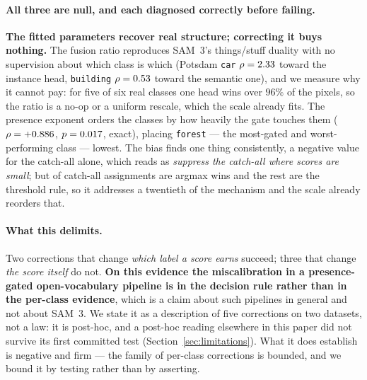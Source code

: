\documentclass[10pt,a4paper]{article}                        %
\newcommand{\best}[1]{\textbf{#1}}
\begin{document}
\paragraph{All three are null, and each diagnosed correctly before failing.}
\best{The fitted parameters recover real structure; correcting it buys nothing.}
The fusion ratio reproduces SAM~3's things/stuff duality with no supervision about
which class is which (Potsdam \texttt{car} $\rho=2.33{}$ toward the instance
head, \texttt{building} $\rho=0.53{}$ toward the semantic one), and we
measure why it cannot pay: for five of six real classes one head wins over
$96\%$ of the pixels, so the ratio is a no-op or a uniform rescale, which the
scale already fits. The presence exponent orders the classes by how heavily the
gate touches them ($\rho=+0.886{}$, $p=0.017{}$, exact), placing
\texttt{forest} --- the most-gated and worst-performing class --- lowest. The bias
finds one thing consistently, a negative value for the catch-all alone, which
reads as \emph{suppress the catch-all where scores are small}; but \mechB{} of
catch-all assignments are argmax wins and the rest are the threshold rule, so it
addresses a twentieth of the mechanism and the scale already reorders that.

\paragraph{What this delimits.} Two corrections that change \emph{which label a
score earns} succeed; three that change \emph{the score itself} do not.
\best{On this evidence the miscalibration in a presence-gated open-vocabulary
pipeline is in the decision rule rather than in the per-class evidence}, which is
a claim about such pipelines in general and not about SAM~3. We state it as a
description of five corrections on two datasets, not a law: it is post-hoc, and a
post-hoc reading elsewhere in this paper did not survive its first committed test
(Section~\ref{sec:limitations}). What it does establish is negative and firm ---
the family of per-class corrections is bounded, and we bound it by testing rather
than by asserting.
\end{document}
